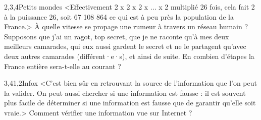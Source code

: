 \begin{quiz}[title={Réseaux sociaux}]
\begin{quizquestion*}[b]{1}{2,3,4}{Petits mondes}
<Effectivement 2 x 2 x 2 x ... x 2 multiplié 26 fois, cela fait 2 à la puissance 26, soit 67 108 864 ce qui est à peu près la population de la France.>
À quelle vitesse se propage une rumeur à travers un réseau humain ?
Supposons que j’ai un ragot, top secret, que je ne raconte qu’à mes deux meilleurs camarades, qui eux aussi gardent le secret et ne le partagent qu’avec deux autres camarades (différent·e·s), et ainsi de suite.
En combien d’étapes la France entière sera-t-elle au courant ?
\end{quizquestion*}

\begin{quizquestion}[b]{3,4}{1,2}{Infox}
<C'est bien sûr en retrouvant la source de l'information que l'on peut la valider.
On peut aussi chercher si une information est fausse : il est souvent plus facile de déterminer si une information est fausse que de garantir qu'elle soit vraie.>
Comment vérifier une information vue sur Internet ?
\end{quizquestion}


\end{quiz}
